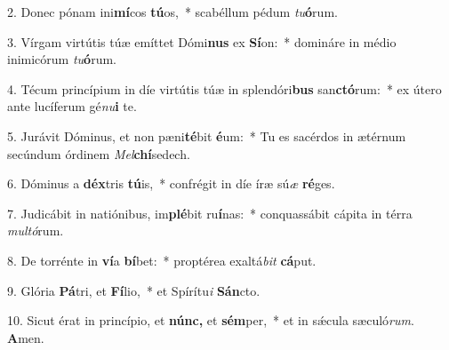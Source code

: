 \item 2. Donec pónam ini\textbf{mí}cos \textbf{tú}os,~* scabéllum pédum \textit{tu}\textbf{ó}rum.

\item 3. Vírgam virtútis túæ emíttet Dómi\textbf{nus} ex \textbf{Sí}on:~* domináre in médio inimicórum \textit{tu}\textbf{ó}rum.

\item 4. Técum princípium in díe virtútis túæ in splendóri\textbf{bus} san\textbf{ctó}rum:~* ex útero ante lucíferum gé\textit{nu}\textbf{i} te.

\item 5. Jurávit Dóminus, et non pæni\textbf{té}bit \textbf{é}um:~* Tu es sacérdos in ætérnum secúndum órdinem \textit{Mel}\textbf{chí}sedech.

\item 6.  Dóminus a \textbf{déx}tris \textbf{tú}is,~* confrégit in díe íræ sú\textit{æ} \textbf{ré}ges.

\item 7. Judicábit in natiónibus, im\textbf{plé}bit ru\textbf{í}nas:~* conquassábit cápita in térra \textit{mul}\textit{tó}rum.

\item 8. De torrénte in \textbf{ví}a \textbf{bí}bet:~* proptérea exaltá\textit{bit} \textbf{cá}put.

\item 9. Glória \textbf{Pá}tri, et \textbf{Fí}lio,~* et Spírítu\textit{i} \textbf{Sán}cto.

\item 10. Sicut érat in princípio, et \textbf{núnc,} et \textbf{sém}per,~* et in sǽcula sæculó\textit{rum}. \textbf{A}men.
